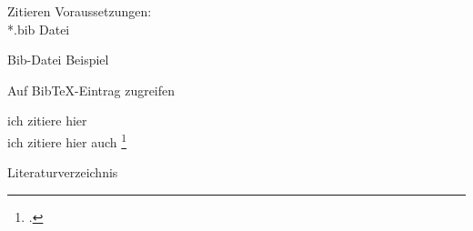 \begin{frame}{Zitieren}
Voraussetzungen:\\
\pause
*.bib Datei\\
\pause
{}
\begin{Code}
\centering

\end{Code}

\end{frame}
\begin{frame}{Bib-Datei Beispiel}
\begin{Code}
\centering

\end{Code}
\end{frame}
\begin{frame}{Auf BibTeX-Eintrag zugreifen}
\begin{Code}
\centering

\end{Code}
\pause
ich zitiere hier \cite{braun:scala}\\
ich zitiere hier auch \footcite{braun:scala}
\end{frame}
\begin{frame}{Literaturverzeichnis}
\begin{Code}
\centering

\end{Code}
\printbibliography
\end{frame}